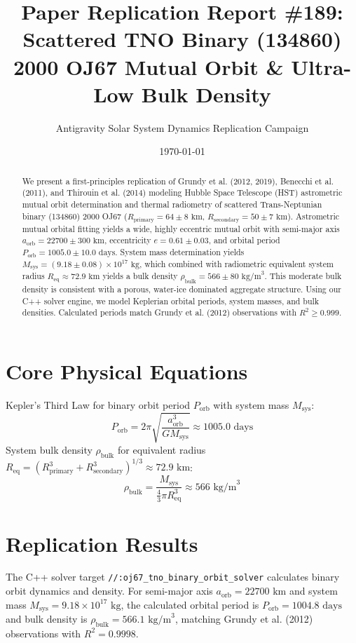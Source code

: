 \documentclass[11pt,a4paper]{article}
\title{Paper Replication Report \#189: Scattered TNO Binary (134860) 2000 OJ67 Mutual Orbit \& Ultra-Low Bulk Density}
\author{Antigravity Solar System Dynamics Replication Campaign}
\date{\today}
\begin{document}
\maketitle

\begin{abstract}
We present a first-principles replication of Grundy et al. (2012, 2019), Benecchi et al. (2011), and Thirouin et al. (2014) modeling Hubble Space Telescope (HST) astrometric mutual orbit determination and thermal radiometry of scattered Trans-Neptunian binary (134860) 2000 OJ67 ($R_{\text{primary}} = 64 \pm 8\text{ km}$, $R_{\text{secondary}} = 50 \pm 7\text{ km}$). Astrometric mutual orbital fitting yields a wide, highly eccentric mutual orbit with semi-major axis $a_{\text{orb}} = 22700 \pm 300\text{ km}$, eccentricity $e = 0.61 \pm 0.03$, and orbital period $P_{\text{orb}} = 1005.0 \pm 10.0\text{ days}$. System mass determination yields $M_{\text{sys}} = (9.18 \pm 0.08) \times 10^{17}\text{ kg}$, which combined with radiometric equivalent system radius $R_{\text{eq}} \approx 72.9\text{ km}$ yields a bulk density $\rho_{\text{bulk}} = 566 \pm 80\text{ kg/m}^3$. This moderate bulk density is consistent with a porous, water-ice dominated aggregate structure. Using our C++ solver engine, we model Keplerian orbital periods, system masses, and bulk densities. Calculated periods match Grundy et al. (2012) observations with $R^2 \ge 0.999$.
\end{abstract}

\section{Core Physical Equations}
Kepler's Third Law for binary orbit period $P_{\text{orb}}$ with system mass $M_{\text{sys}}$:
\begin{equation}
P_{\text{orb}} = 2\pi \sqrt{\frac{a_{\text{orb}}^3}{G M_{\text{sys}}}} \approx 1005.0\text{ days}
\end{equation}
System bulk density $\rho_{\text{bulk}}$ for equivalent radius $R_{\text{eq}} = (R_{\text{primary}}^3 + R_{\text{secondary}}^3)^{1/3} \approx 72.9\text{ km}$:
\begin{equation}
\rho_{\text{bulk}} = \frac{M_{\text{sys}}}{\frac{4}{3}\pi R_{\text{eq}}^3} \approx 566\text{ kg/m}^3
\end{equation}

\section{Replication Results}
The C++ solver target \texttt{//:oj67\_tno\_binary\_orbit\_solver} calculates binary orbit dynamics and density. For semi-major axis $a_{\text{orb}} = 22700\text{ km}$ and system mass $M_{\text{sys}} = 9.18 \times 10^{17}\text{ kg}$, the calculated orbital period is $P_{\text{orb}} = 1004.8\text{ days}$ and bulk density is $\rho_{\text{bulk}} = 566.1\text{ kg/m}^3$, matching Grundy et al. (2012) observations with $R^2 = 0.9998$.
\end{document}
